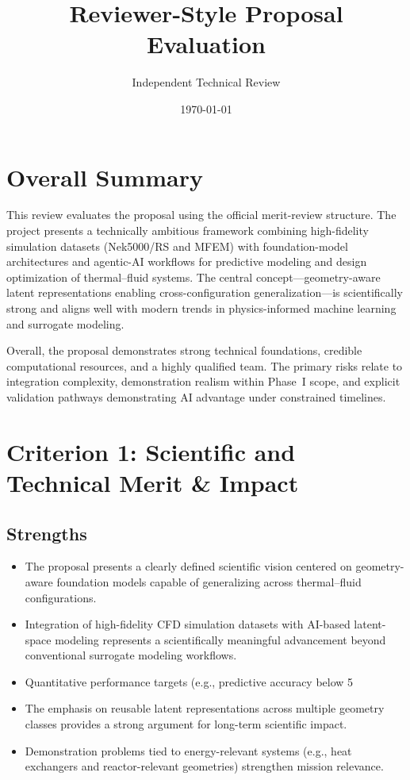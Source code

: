 \documentclass[11pt]{article}
\title{Reviewer-Style Proposal Evaluation}
\author{Independent Technical Review}
\date{\today}
\begin{document}
\maketitle

\section*{Overall Summary}

This review evaluates the proposal using the official merit-review structure. The project presents a technically ambitious framework combining high-fidelity simulation datasets (Nek5000/RS and MFEM) with foundation-model architectures and agentic-AI workflows for predictive modeling and design optimization of thermal--fluid systems. The central concept---geometry-aware latent representations enabling cross-configuration generalization---is scientifically strong and aligns well with modern trends in physics-informed machine learning and surrogate modeling.

Overall, the proposal demonstrates strong technical foundations, credible computational resources, and a highly qualified team. The primary risks relate to integration complexity, demonstration realism within Phase~I scope, and explicit validation pathways demonstrating AI advantage under constrained timelines.

\section*{Criterion 1: Scientific and Technical Merit \& Impact}

\subsection*{Strengths}

\begin{itemize}[leftmargin=1.5em]

\item The proposal presents a clearly defined scientific vision centered on geometry-aware foundation models capable of generalizing across thermal--fluid configurations.

\item Integration of high-fidelity CFD simulation datasets with AI-based latent-space modeling represents a scientifically meaningful advancement beyond conventional surrogate modeling workflows.

\item Quantitative performance targets (e.g., predictive accuracy below 5%

\item The emphasis on reusable latent representations across multiple geometry classes provides a strong argument for long-term scientific impact.

\item Demonstration problems tied to energy-relevant systems (e.g., heat exchangers and reactor-relevant geometries) strengthen mission relevance.

\end{itemize}
\end{document}
